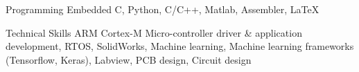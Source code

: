 

\begin{cvskills}

  \cvskill
    {Programming} %
    {Embedded C, Python, C/C++, Matlab, Assembler, \LaTeX} %

  \cvskill
    {Technical Skills} %
    {ARM Cortex-M Micro-controller driver \& application development, RTOS, SolidWorks, Machine learning, Machine learning frameworks (Tensorflow, Keras), Labview, PCB design, Circuit design} %


\end{cvskills}

